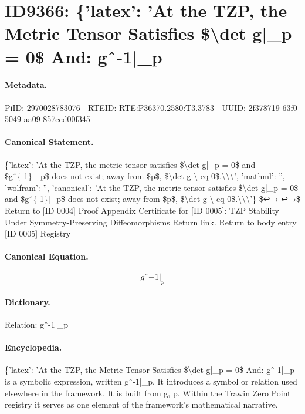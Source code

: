 \section*{ID9366: \{'latex': 'At the TZP, the Metric Tensor Satisfies \$\textbackslash{}det g|\_p = 0\$ And: gˆ-1|\_p}
\paragraph{Metadata.}
PiID: 2970028783076 | RTEID: RTE:P36370.2580:T3.3783 | UUID: 2f378719-63f0-5049-aa09-857ecd00f345

\paragraph{Canonical Statement.}
\{'latex': 'At the TZP, the metric tensor satisfies \$\textbackslash{}det g|\_p = 0\$ and \$gˆ\{-1\}|\_p\$ does not exist; away from \$p\$, \$\textbackslash{}det g \textbackslash{} eq 0\$.\textbackslash{}\textbackslash{}\textbackslash{}', 'mathml': '', 'wolfram': '', 'canonical': 'At the TZP, the metric tensor satisfies \$\textbackslash{}det g|\_p = 0\$ and \$gˆ\{-1\}|\_p\$ does not exist; away from \$p\$, \$\textbackslash{}det g \textbackslash{} eq 0\$.\textbackslash{}\textbackslash{}\textbackslash{}'\} \$↩→ ↩→\$ Return to [ID 0004] Proof Appendix Certificate for [ID 0005]: TZP Stability Under Symmetry-Preserving Diffeomorphisms Return link. Return to body entry [ID 0005] Registry

\paragraph{Canonical Equation.}
\[
gˆ{-1}|_p
\]

\paragraph{Dictionary.}
Relation: gˆ-1|\_p

\paragraph{Encyclopedia.}
\{'latex': 'At the TZP, the Metric Tensor Satisfies \$\textbackslash{}det g|\_p = 0\$ And: gˆ-1|\_p is a symbolic expression, written gˆ-1|\_p. It introduces a symbol or relation used elsewhere in the framework. It is built from g, p. Within the Trawin Zero Point registry it serves as one element of the framework's mathematical narrative.
